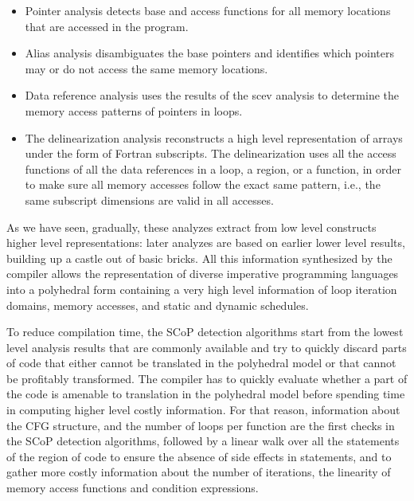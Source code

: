 \documentclass{sig-alternate}
\begin{document}
\begin{itemize}
\item Pointer analysis detects base and access functions for all memory
  locations that are accessed in the program.

\item Alias analysis disambiguates the base pointers and identifies which
  pointers may or do not access the same memory locations.

\item Data reference analysis uses the results of the scev analysis to determine
  the memory access patterns of pointers in loops.

\item The delinearization analysis \cite{delinearization1, delinearization2}
  reconstructs a high level representation of arrays under the form of Fortran
  subscripts.  The delinearization uses all the access functions of all the data
  references in a loop, a region, or a function, in order to make sure all
  memory accesses follow the exact same pattern, i.e., the same subscript
  dimensions are valid in all accesses.
\end{itemize}

As we have seen, gradually, these analyzes extract from low level constructs
higher level representations: later analyzes are based on earlier lower level
results, building up a castle out of basic bricks.  All this information
synthesized by the compiler allows the representation of diverse imperative
programming languages into a polyhedral form \cite{Girbal} containing a very
high level information of loop iteration domains, memory accesses, and static
and dynamic schedules.

To reduce compilation time, the SCoP detection algorithms start from the lowest
level analysis results that are commonly available and try to quickly discard
parts of code that either cannot be translated in the polyhedral model or that
cannot be profitably transformed.  The compiler has to quickly evaluate whether
a part of the code is amenable to translation in the polyhedral model before
spending time in computing higher level costly information.  For that reason,
information about the CFG structure, and the number of loops per function are
the first checks in the SCoP detection algorithms, followed by a linear walk
over all the statements of the region of code to ensure the absence of side
effects in statements, and to gather more costly information about the number of
iterations, the linearity of memory access functions and condition expressions.
\end{document}
